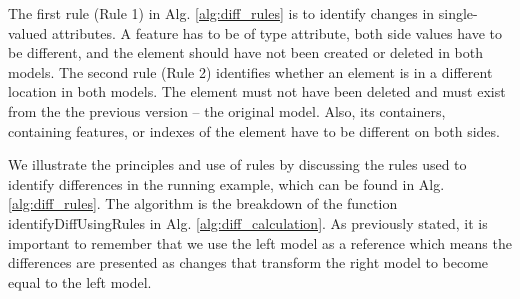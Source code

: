 The first rule (Rule 1) in Alg. \ref{alg:diff_rules} is to identify changes in single-valued attributes. A feature has to be of type \textsf{attribute}, both side values have to be different, and the element should have not been created or deleted in both models. The second rule (Rule 2) identifies whether an element is in a different location in both models. The element must not have been deleted and must exist from the the previous version -- the original model. Also, its containers, containing features, or indexes of the element have to be different on both sides.

We illustrate the principles and use of rules by discussing the rules used to identify differences in the running example, which can be found in Alg. \ref{alg:diff_rules}. The algorithm is the breakdown of the function \textsf{identifyDiffUsingRules} in Alg. \ref{alg:diff_calculation}. As previously stated, it is important to remember that we use the left model as a reference which means the differences are presented as changes that transform the right model to become equal to the left model. 

